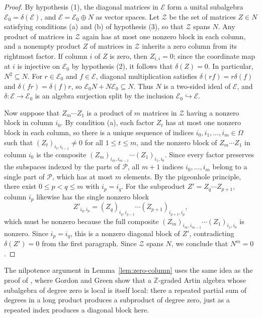 \documentclass[a4paper,reqno,10pt]{amsart}
\theoremstyle{definition}
\numberwithin{equation}{section}
\begin{document}
\begin{proof}
By hypothesis (1), the diagonal matrices in $\mathcal E$ form a unital subalgebra $\mathcal E_0=\delta(\mathcal E)$, and $\mathcal E=\mathcal E_0\oplus N$ as vector spaces. Let $\mathcal Z$ be the set of matrices $Z\in N$ satisfying conditions (a) and (b) of hypothesis (3), so that $\mathcal Z$ spans $N$. Any product of matrices in $\mathcal Z$ again
has at most one nonzero block in each column, and a nonempty product
$Z$ of matrices in $\mathcal Z$ inherits a zero column from its rightmost factor. If column $i$ of $Z$ is zero,
then $Z_{i,i}=0$; since the coordinate map at $i$ is injective
on $\mathcal E_0$ by hypothesis (2), it follows that $\delta(Z)=0$.
In particular, $N^2\subseteq N$.
For $r\in \mathcal E_0$ and $f\in \mathcal E$, diagonal multiplication satisfies
$\delta(rf)=r\delta(f)$ and $\delta(fr)=\delta(f)r$,
so $\mathcal E_0N+N\mathcal E_0\subseteq N$. Thus
$N$ is a two-sided ideal of $\mathcal E$, and $\delta:\mathcal E\to \mathcal E_0$ is an algebra surjection split by the inclusion $\mathcal E_0\hookrightarrow \mathcal E$.

Now suppose that $Z_m\cdots Z_1$ is a product of $m$ matrices in $\mathcal Z$
having a nonzero block in column $i_0$. By condition (a), each factor $Z_t$
has at most one nonzero block in each column, so there is a unique sequence
of indices $i_0,i_1,\ldots,i_m\in\Omega$ such that $(Z_t)_{i_t,i_{t-1}}\ne0$
for all $1\le t\le m$, and the nonzero block of $Z_m\cdots Z_1$ in column
$i_0$ is the composite $(Z_m)_{i_m,i_{m-1}}\cdots(Z_1)_{i_1,i_0}$.
Since every factor preserves the subspaces indexed by the parts of $\mathcal P$,
all $m+1$ indices $i_0,\ldots,i_m$ belong to a single part of $\mathcal P$, which has at most $m$
elements. By the pigeonhole principle, there exist $0\le p<q\le m$ with $i_p=i_q$.
For the subproduct $Z'=Z_q\cdots Z_{p+1}$, column $i_p$ likewise has the
single nonzero block
\[
 Z'_{i_q,i_p}=(Z_q)_{i_q,i_{q-1}}\cdots(Z_{p+1})_{i_{p+1},i_p},
\]
which must be nonzero because the full composite
$(Z_m)_{i_m,i_{m-1}}\cdots(Z_1)_{i_1,i_0}$ is nonzero.
Since $i_p=i_q$, this is a nonzero diagonal block of $Z'$,
contradicting $\delta(Z')=0$ from the first paragraph.
Since $\mathcal Z$ spans $N$, we conclude that $N^m=0$.
\end{proof}

The nilpotence argument in Lemma~\ref{lem:zero-column} uses the same idea
as the proof of
\cite[Theorem~3.1]{GordonGreen}, where Gordon and Green show that a
$\mathbb Z$-graded Artin algebra whose subalgebra of degree zero is local
is itself local: there a repeated partial sum of degrees in a long product
produces a subproduct of degree zero, just as a repeated index produces a diagonal block
here.
\end{document}
